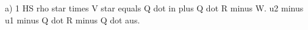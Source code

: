 a) 1 HS  
rho star times V star equals Q dot in plus Q dot R minus W.  
u2 minus u1 minus Q dot R minus Q dot aus.